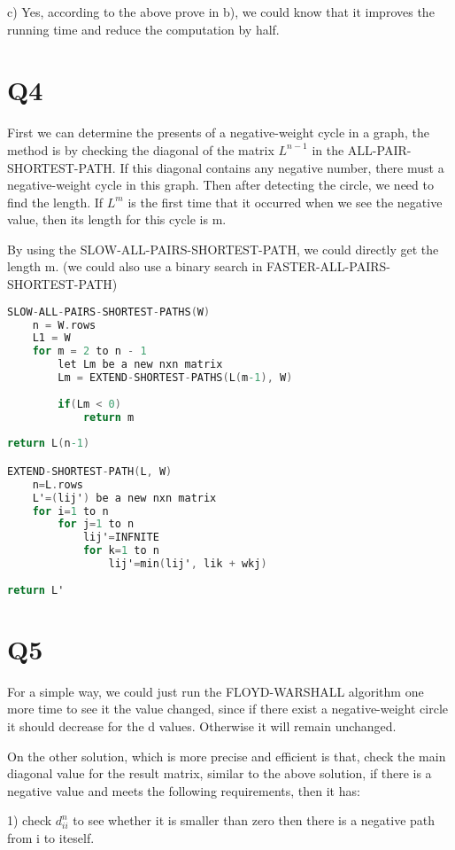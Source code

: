 \documentclass{article}
\begin{document}
c) Yes, according to the above prove in b), we could know that it improves the running time and reduce the computation by half.

\section{Q4}

First we can determine the presents of a negative-weight cycle in a graph, the method is by checking the diagonal of
the matrix $L^{n-1}$ in the ALL-PAIR-SHORTEST-PATH. If this diagonal contains any negative number, there must a negative-weight cycle in this graph. Then after detecting the circle, we need to find the length. If $L^{m}$ is the
first time that it occurred when we see the negative value, then its length for this cycle is m.

By using the SLOW-ALL-PAIRS-SHORTEST-PATH, we could directly get the length m. (we could also use a binary search in
FASTER-ALL-PAIRS-SHORTEST-PATH)

\begin{lstlisting}[language=C]
SLOW-ALL-PAIRS-SHORTEST-PATHS(W)
	n = W.rows
	L1 = W
	for m = 2 to n - 1
		let Lm be a new nxn matrix
		Lm = EXTEND-SHORTEST-PATHS(L(m-1), W)
		
		if(Lm < 0)
			return m
				
return L(n-1)

EXTEND-SHORTEST-PATH(L, W)
	n=L.rows
	L'=(lij') be a new nxn matrix
	for i=1 to n
		for j=1 to n
			lij'=INFNITE
			for k=1 to n
				lij'=min(lij', lik + wkj)
				
return L'

\end{lstlisting}

\section{Q5}
For a simple way, we could just run the FLOYD-WARSHALL algorithm one more time to see it the value changed, since if there exist a negative-weight circle it should decrease for the d values. Otherwise it will remain unchanged.

On the other solution, which is more precise and efficient is that, check the main diagonal value for the result matrix,
similar to the above solution, if there is a negative value and meets the following requirements, then it has:

1) check $d_{ii}^{n}$ to see whether it is smaller than zero then there is a negative path from i to iteself.
\end{document}
